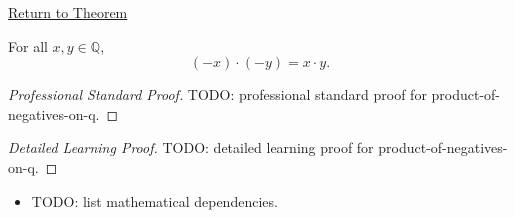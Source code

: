 \newpage
{}
\label{prf:product-of-negatives-on-q}

\begin{remark*}[Return]
\hyperref[cor:product-of-negatives-on-q]{Return to Theorem}
\end{remark*}

\begin{corollary*}
For all $x,y\in\mathbb{Q}$,
\[
(-x)\cdot(-y)=x\cdot y.
\]
\end{corollary*}

\begin{proof}[Professional Standard Proof]
\LRAProofBodyStart
TODO: professional standard proof for product-of-negatives-on-q.
\end{proof}

\begin{proof}[Detailed Learning Proof]
\LRAProofBodyStart
TODO: detailed learning proof for product-of-negatives-on-q.
\end{proof}

\begin{remark*}
\end{remark*}

\begin{dependencies}
\begin{itemize}
  \item TODO: list mathematical dependencies.
\end{itemize}
\end{dependencies}

\clearpage
